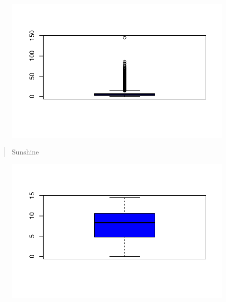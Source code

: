 \documentclass[
  letterpaper,
  DIV=11,
  numbers=noendperiod]{scrartcl}
\newenvironment{Shaded}{\begin{snugshade}}{\end{snugshade}}
\newcommand{\AttributeTok}[1]{\textcolor[rgb]{0.40,0.45,0.13}{#1}}
\newcommand{\FunctionTok}[1]{\textcolor[rgb]{0.28,0.35,0.67}{#1}}
\newcommand{\NormalTok}[1]{\textcolor[rgb]{0.00,0.23,0.31}{#1}}
\newcommand{\SpecialCharTok}[1]{\textcolor[rgb]{0.37,0.37,0.37}{#1}}
\newcommand{\StringTok}[1]{\textcolor[rgb]{0.13,0.47,0.30}{#1}}
\begin{document}
\begin{figure}[H]

{\centering \includegraphics{RainAus_EDA_files/figure-pdf/unnamed-chunk-13-1.pdf}

}

\end{figure}

\begin{quote}
Sunshine
\end{quote}

\begin{Shaded}
\end{Shaded}

\begin{figure}[H]

{\centering \includegraphics{RainAus_EDA_files/figure-pdf/unnamed-chunk-14-1.pdf}

}

\end{figure}
\end{document}
